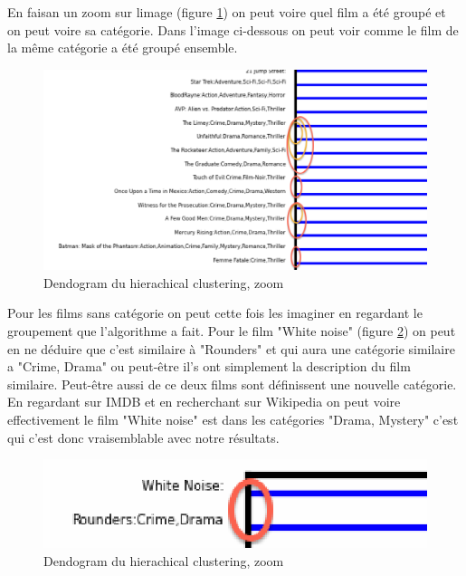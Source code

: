 	En faisan un zoom sur limage (figure \ref{zoom}) on peut voire quel film a été groupé et on peut voire sa catégorie. Dans l'image ci-dessous on peut voir comme le film de la même catégorie a été groupé ensemble.
		\begin{figure}[h]
		  \centering
		    \includegraphics[width=1\linewidth]{img/zoom.png}
		  \caption{Dendogram du hierachical clustering, zoom}
		  \label{zoom}
		\end{figure}
		\newpage
	Pour les films sans catégorie on peut cette fois les imaginer en regardant le groupement que l'algorithme a fait. Pour le film "White noise" (figure \ref{whitenoise}) on peut en ne déduire que c'est similaire à "Rounders" et qui aura une catégorie similaire a "Crime, Drama" ou peut-être il's ont simplement la description du film similaire. Peut-être aussi de ce deux films sont définissent une nouvelle catégorie. En regardant sur IMDB et en recherchant sur Wikipedia on peut voire effectivement le film "White noise" est dans les catégories "Drama, Mystery" c'est qui c'est donc vraisemblable avec notre résultats.
		
	 
		\begin{figure}[h]
			  \centering
			    \includegraphics[width=0.6\linewidth]{img/whitenoise.png}
			  \caption{Dendogram du hierachical clustering, zoom}
			  \label{whitenoise}
			\end{figure}
	

